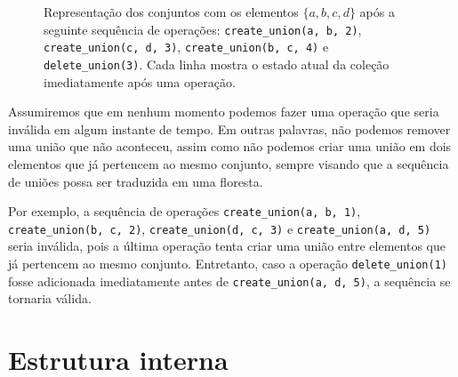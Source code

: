 \begin{figure}[h!]
\begin{subfigure}{\textwidth}
        \bigskip
    \end{subfigure}
    \begin{subfigure}{\textwidth}
        \centering
    \end{subfigure}
    \caption{Representação dos conjuntos com os elementos $\{a,b,c,d\}$ após a seguinte sequência de operações: \texttt{create\_union(a, b, 2)}, \texttt{create\_union(c, d, 3)}, \texttt{create\_union(b, c, 4)} e \texttt{delete\_union(3)}. Cada linha mostra o estado atual da coleção imediatamente após uma operação.}
    \label{fig:uf-sets}
\end{figure}

Assumiremos que em nenhum momento podemos fazer uma operação que seria inválida em algum instante de tempo. Em outras palavras, não podemos remover uma união que não aconteceu, assim como não podemos criar uma união em dois elementos que já pertencem ao mesmo conjunto, sempre visando que a sequência de uniões possa ser traduzida em uma floresta.

Por exemplo, a sequência de operações \texttt{create\_union(a, b, 1)}, \texttt{create\_union(b, c, 2)}, \texttt{create\_union(d, c, 3)} e \texttt{create\_union(a, d, 5)} seria inválida, pois a última operação tenta criar uma união entre elementos que já pertencem ao mesmo conjunto. Entretanto, caso a operação \texttt{delete\_union(1)} fosse adicionada imediatamente antes de \texttt{create\_union(a, d, 5)}, a sequência se tornaria válida.

\section{Estrutura interna}
\label{sec:uf-estrutura}

